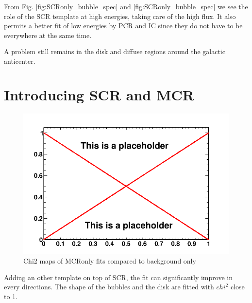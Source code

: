 From Fig. \ref{fig:SCRonly_bubble_spec} and \ref{fig:SCRonly_bubble_spec} we see the role of the SCR template at high energies, taking care of the high flux. It also permits a better fit of low energies by PCR and IC since they do not have to be everywhere at the same time.

A problem still remains in the disk and diffuse regions around the galactic anticenter. 



\section{Introducing SCR and MCR}

\begin{figure}[h]
  \centering
  \includegraphics[width=.9\linewidth]{pic/dummy.png}
  \caption{Chi2 maps of MCRonly fits compared to background only}
  \label{fig:MCRonly_fit}
\end{figure}

Adding an other template on top of SCR, the fit can significantly improve in every directions. The shape of the bubbles and the disk are fitted with $chi^2$ close to 1. 


